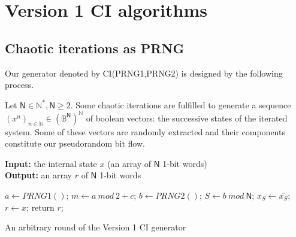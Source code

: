 \section{Version 1 CI algorithms}
\label{Version 1 CI algorithms and examples}
\subsection{Chaotic iterations as PRNG}
\label{subsec Chaotic iterations as PRNG}
Our generator denoted by CI(PRNG1,PRNG2) is designed by the following process. 

Let $\mathsf{N} \in \mathds{N}^*, \mathsf{N} \geqslant 2$. Some chaotic iterations are fulfilled to generate a sequence $\left(x^n\right)_{n\in\mathds{N}} \in \left(\mathds{B}^\mathsf{N}\right)^\mathds{N}$ of boolean vectors: the successive states of the iterated system. Some of these vectors are randomly extracted and their components constitute our pseudorandom bit flow.
\begin{algorithm}
\textbf{Input:} the internal state $x$ (an array of $\mathsf{N}$ 1-bit words)\\
\textbf{Output:} an array $r$ of $\mathsf{N}$ 1-bit words
\begin{algorithmic}[1]

\STATE$a\leftarrow{PRNG1()}$;
\STATE$m\leftarrow{a~mod~2+c}$;
\STATE$b\leftarrow{PRNG2()}$;
\STATE$S\leftarrow{b~mod~\mathsf{N}}$;
\STATE$x_S\leftarrow{ \overline{x_S}}$;
\ENDWHILE
\STATE$r\leftarrow{x}$;
\STATE return $r$;
\medskip
\caption{An arbitrary round of the Version 1 CI generator}
\label{Chaotic iteration}
\end{algorithmic}
\end{algorithm}

